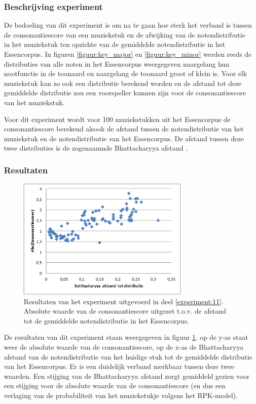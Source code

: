 \subsubsection{Beschrijving experiment}
De bedoeling van dit experiment is om na te gaan hoe sterk het verband is tussen de consonantiescore van een muziekstuk en de afwijking van de notendistributie in het muziekstuk ten opzichte van de gemiddelde notendistributie in het Essencorpus. In figuren \ref{figuur:key_major} en \ref{figuur:key_minor} werden reeds de distributies van alle noten in het Essencorpus weergegeven naargelang hun nootfunctie in de toonaard en naargelang de toonaard groot of klein is. Voor elk muziekstuk kan zo ook een distributie berekend worden en de afstand tot deze gemiddelde distributie zou een voorspeller kunnen zijn voor de consonantiescore van het muziekstuk. 

Voor dit experiment wordt voor 100 muziekstukken uit het Essencorpus de consonantiescore berekend alsook de afstand tussen de notendistributie van het muziekstuk en de notendistributie van het Essencorpus. De afstand tussen deze twee distributies is de zogenaamnde Bhattacharyya afstand \cite{url:Bhattacharyya}. 

\subsubsection{Resultaten}
\begin{figure}[!ht]
  \centering
  \includegraphics[width=0.75\textwidth]{5_Experimenten_Resultaten/exp11_res}
  \caption{Resultaten van het experiment uitgevoerd in deel \ref{experiment:11}. Absolute waarde van de consonantiescore uitgezet t.o.v. de afstand tot de gemiddelde notendistributie in het Essencorpus.}
  \label{figuur:exp11}
\end{figure}

De resultaten van dit experiment staan weergegeven in figuur \ref{figuur:exp11}. op de y-as staat weer de absolute waarde van de consonantiescore, op de x-as de Bhattacharyya afstand van de notendistributie van het huidige stuk tot de gemiddelde distributie van het Essencorpus. Er is een duidelijk verband merkbaar tussen deze twee waarden. Een stijging van de Bhattacharyya afstand zorgt gemiddeld gezien voor een stijging voor de absolute waarde van de consonantiescore (en dus een verlaging van de probabiliteit van het muziekstukje volgens het RPK-model).

